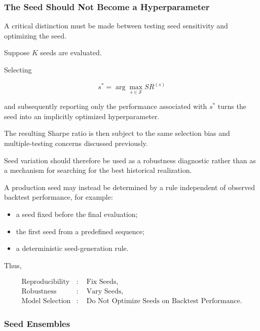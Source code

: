 \documentclass[11pt,a4paper]{article}
\begin{document}
\subsubsection{The Seed Should Not Become a Hyperparameter}

A critical distinction must be made between testing seed sensitivity and
optimizing the seed.

Suppose $K$ seeds are evaluated.

Selecting

\begin{equation}
\boxed{
s^*
=
\arg\max_{s\in\mathcal{S}}
SR^{(s)}
}
\end{equation}

and subsequently reporting only the performance associated with $s^*$ turns the
seed into an implicitly optimized hyperparameter.

The resulting Sharpe ratio is then subject to the same selection bias and
multiple-testing concerns discussed previously.

Seed variation should therefore be used as a robustness diagnostic rather than
as a mechanism for searching for the best historical realization.

A production seed may instead be determined by a rule independent of observed
backtest performance, for example:

\begin{itemize}
    \item a seed fixed before the final evaluation;
    \item the first seed from a predefined sequence;
    \item a deterministic seed-generation rule.
\end{itemize}

Thus,

\begin{equation}
\boxed{
\begin{aligned}
\text{Reproducibility} &:\quad \text{Fix Seeds},\\
\text{Robustness} &:\quad \text{Vary Seeds},\\
\text{Model Selection} &:\quad \text{Do Not Optimize Seeds on Backtest Performance}.
\end{aligned}
}
\end{equation}


\subsubsection{Seed Ensembles}
\end{document}
